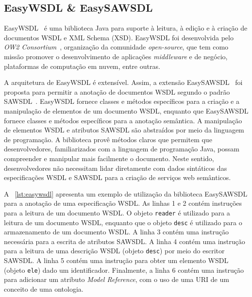 \subsection{EasyWSDL \& EasySAWSDL}\label{2-fundamentacao-ferramentas-easywsdl}

EasyWSDL~\cite{EasyWSDL-2016} é uma biblioteca Java para suporte à leitura, à edição e à criação de documentos WSDL e XML Schema (XSD). EasyWSDL foi desenvolvida pelo \textit{OW2 Consortium}~\cite{OW2-2016-Site}, organização da comunidade \textit{open-source}, que tem como missão promover o desenvolvimento de aplicações \textit{middleware} e de negócio, plataformas de computação em nuvem, entre outras.

A arquitetura de EasyWSDL é extensível. Assim, a extensão EasySAWSDL~\cite{EasySAWSDL-2016} foi proposta para permitir a anotação de documentos WSDL segundo o padrão SAWSDL~\cite{W3C-2007-SAWSDL}. EasyWSDL fornece classes e métodos específicos para a criação e a manipulação de elementos de um documento WSDL, enquanto que EasySAWSDL fornece classes e métodos específicos para a anotação semântica. A manipulação de elementos WSDL e atributos SAWSDL são abstraídos por meio da linguagem de programação. A biblioteca provê métodos claros que permitem que desenvolvedores, familiarizados com a linguagem de programação Java, possam compreender e manipular mais facilmente o documento. Neste sentido, desenvolvedores não necessitam lidar diretamente com dados sintáticos das especificações WSDL e SAWSDL para a criação de serviços web semânticos.


A \lstlistingname~\ref{lst:easywsdl} apresenta um exemplo de utilização da biblioteca EasySAWSDL para a anotação de uma especificação WSDL. As linhas 1 e 2 contém instruções para a leitura de um documento WSDL. O objeto \texttt{reader} é utilizado para a leitura de um documento WSDL, enquanto que o objeto \texttt{desc} é utilizado para o armazenamento de um documento WSDL. A linha 3 contém uma instrução necessária para a escrita de atributos SAWSDL. A linha 4 contém uma instrução para a leitura de uma descrição WSDL (objeto \texttt{desc}) por meio do escritor SAWSDL. A linha 5 contém uma instrução para obter um elemento WSDL (objeto \texttt{ele}) dado um identificador. Finalmente, a linha 6 contém uma instrução para adicionar um atributo \textit{Model Reference}, com o uso de uma URI de um conceito de uma ontologia.

